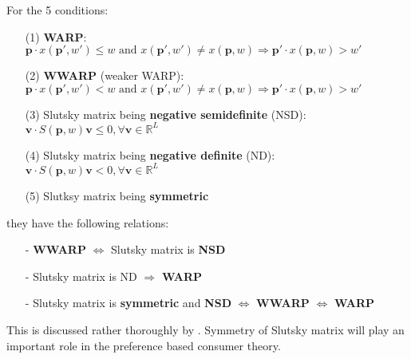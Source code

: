 For the 5 conditions:
    \begin{enumerate}
        \item[(1)] \textbf{WARP}: $\mathbf{p}\cdot  x(\mathbf{p}',w')\leq w\text{ and } x(\mathbf{p}',w')\neq  x(\mathbf{p},w)\Rightarrow \mathbf{p}'\cdot x(\mathbf{p},w)>w'$
        \item[(2)] \textbf{WWARP} (weaker WARP): $\mathbf{p}\cdot  x(\mathbf{p}',w')< w\text{ and } x(\mathbf{p}',w')\neq  x(\mathbf{p},w)\Rightarrow \mathbf{p}'\cdot x(\mathbf{p},w)>w'$
        \item[(3)] Slutsky matrix being \textbf{negative semidefinite} (NSD): $\mathbf{v}\cdot S(\mathbf{p},w)\mathbf{v}\leq 0, \forall \mathbf{v}\in\mathbb{R}^L$
        \item[(4)] Slutsky matrix being \textbf{negative definite} (ND): $\mathbf{v}\cdot S(\mathbf{p},w)\mathbf{v}< 0, \forall \mathbf{v}\in\mathbb{R}^L$
        \item[(5)] Slutksy matrix being \textbf{symmetric} 
    \end{enumerate}

    they have the following relations:
    \begin{enumerate}
        \item[-] \textbf{WWARP} $\Leftrightarrow$ Slutsky matrix is \textbf{NSD} 
        \item[-] Slutsky matrix is ND $\Rightarrow$ \textbf{WARP} 
        \item[-] Slutsky matrix is \textbf{symmetric} and \textbf{NSD} $\Leftrightarrow$ \textbf{WWARP} $\Leftrightarrow$ \textbf{WARP}
    \end{enumerate}
    
    This is discussed rather thoroughly by \citet{kihlstrom1976demand}. Symmetry of Slutsky matrix will play an important role in the preference based consumer theory.